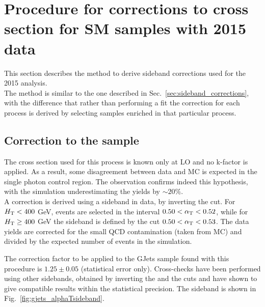 \section{Procedure for corrections to cross section for SM samples with 2015 data}
\label{app:sideband-corrections-old}
This section describes the method to derive sideband corrections used for the 2015 analysis. \\
The method is similar to the one described in Sec.~\ref{sec:sideband_corrections}, with the difference 
that rather than performing a fit the correction for each process is derived by selecting samples 
enriched in that particular process. 

\subsection{Correction to the \gj sample}
\label{sec:sideband_corrections_gjets}
The cross section used for this process is known only at LO and no k-factor is applied. 
As a result, some disagreement between data and MC is expected in the single photon control region.
The observation confirms indeed this hypothesis, with the simulation underestimating the yields by $\sim 20\%$. \\
A correction is derived using a sideband in data, by inverting the \alphat cut. 
For $\scalht < 400$ GeV, events are selected in the interval $0.50 < \alphat < 0.52$, 
while for $\scalht \geq 400$ GeV the sideband is defined by the cut $0.50 < \alphat < 0.53$.
The data yields are corrected for the small QCD contamination (taken from MC) and divided by the expected number of events in the simulation. 

The correction factor to be applied to the GJets sample found with this procedure is $1.25 \pm 0.05$ (statistical error only). 
Cross-checks have been performed using other sidebands, obtained by inverting the \scalht and the \mhtmet cuts 
and have shown to give compatible results within the statistical precision. 
The sideband is shown in Fig.~\ref{fig:gjets_alphaTsideband}. 

